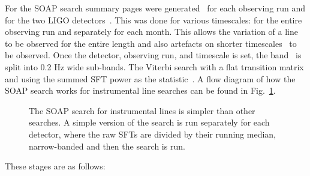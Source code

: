For the SOAP search summary pages were generated~ for each observing run and for
the two \gls{LIGO} detectors~. This was done for various timescales: for the
entire observing run and separately for each month.  This allows the variation
of a line to be observed for the entire length and also artefacts on shorter
timescales~ to be observed. Once the detector, observing
run, and timescale is
set, the band~ is split into 0.2 Hz wide sub-bands.  The Viterbi search with a
flat transition matrix and using the summed \gls{SFT} power as the
statistic~.
A flow diagram of how the SOAP search works for instrumental line searches can
be found in Fig.~\ref{detchar:summary:flow}.
%
%
\begin{figure}[hp]
	\centering
	
	
	\caption[Flow diagram for SOAP line search.]{\label{detchar:summary:flow} The SOAP search for instrumental lines is simpler than other searches. A simple version of the search is run separately for each detector, where the raw \glspl{SFT} are divided by their running median, narrow-banded and then the search is run. }
	
\end{figure} 
These stages are as follows:
